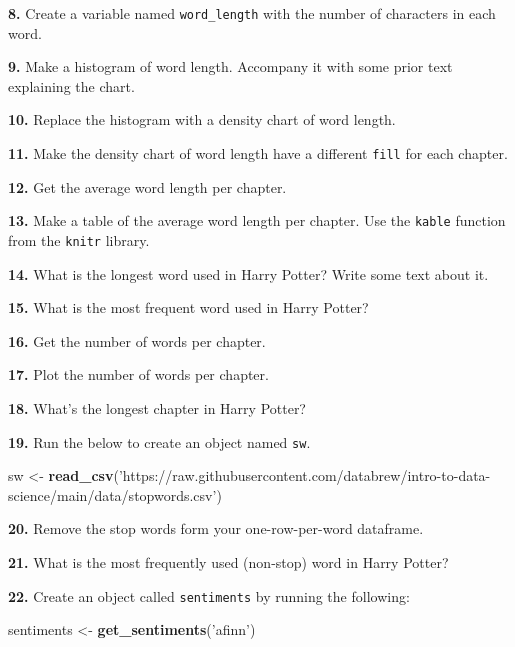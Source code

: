 \documentclass[]{book}
\newenvironment{Shaded}{\begin{snugshade}}{\end{snugshade}}
\newcommand{\KeywordTok}[1]{\textcolor[rgb]{0.13,0.29,0.53}{\textbf{#1}}}
\newcommand{\NormalTok}[1]{#1}
\newcommand{\StringTok}[1]{\textcolor[rgb]{0.31,0.60,0.02}{#1}}
\begin{document}
\textbf{8.} Create a variable named \texttt{word\_length} with the number of characters in each word.

\textbf{9.} Make a histogram of word length. Accompany it with some prior text explaining the chart.

\textbf{10.} Replace the histogram with a density chart of word length.

\textbf{11.} Make the density chart of word length have a different \texttt{fill} for each chapter.

\textbf{12.} Get the average word length per chapter.

\textbf{13.} Make a table of the average word length per chapter. Use the \texttt{kable} function from the \texttt{knitr} library.

\textbf{14.} What is the longest word used in Harry Potter? Write some text about it.

\textbf{15.} What is the most frequent word used in Harry Potter?

\textbf{16.} Get the number of words per chapter.

\textbf{17.} Plot the number of words per chapter.

\textbf{18.} What's the longest chapter in Harry Potter?

\textbf{19.} Run the below to create an object named \texttt{sw}.

\begin{Shaded}
\begin{Highlighting}[]
\NormalTok{sw <-}\StringTok{ }\KeywordTok{read_csv}\NormalTok{(}\StringTok{'https://raw.githubusercontent.com/databrew/intro-to-data-science/main/data/stopwords.csv'}\NormalTok{)}
\end{Highlighting}
\end{Shaded}

\textbf{20.} Remove the stop words form your one-row-per-word dataframe.

\textbf{21.} What is the most frequently used (non-stop) word in Harry Potter?

\textbf{22.} Create an object called \texttt{sentiments} by running the following:

\begin{Shaded}
\begin{Highlighting}[]
\NormalTok{sentiments <-}\StringTok{ }\KeywordTok{get_sentiments}\NormalTok{(}\StringTok{'afinn'}\NormalTok{)}
\end{Highlighting}
\end{Shaded}
\end{document}

